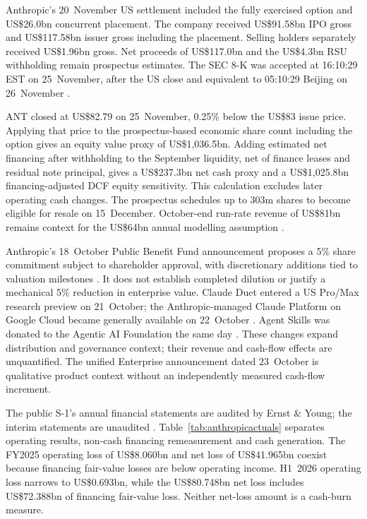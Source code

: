 \documentclass[11pt]{article}
\begin{document}
Anthropic's 20~November US settlement included the fully exercised option and US\$26.0bn concurrent placement. The company received US\$91.58bn IPO gross and US\$117.58bn issuer gross including the placement. Selling holders separately received US\$1.96bn gross. Net proceeds of US\$117.0bn and the US\$4.3bn RSU withholding remain prospectus estimates. The SEC 8-K was accepted at 16:10:29 EST on 25~November, after the US close and equivalent to 05:10:29 Beijing on 26~November \citep{anthropicsettle2026,anthropicpricing2026}.

ANT closed at US\$82.79 on 25~November, 0.25\% below the US\$83 issue price. Applying that price to the prospectus-based economic share count including the option gives an equity value proxy of US\$1,036.5bn. Adding estimated net financing after withholding to the September liquidity, net of finance leases and residual note principal, gives a US\$237.3bn net cash proxy and a US\$1,025.8bn financing-adjusted DCF equity sensitivity. This calculation excludes later operating cash changes. The prospectus schedules up to 303m shares to become eligible for resale on 15~December. October-end run-rate revenue of US\$81bn remains context for the US\$64bn annual modelling assumption \citep{anthropicpricing2026,anthropicnasdaq2026,anthropicoffer2026}.

Anthropic's 18~October Public Benefit Fund announcement proposes a 5\% share commitment subject to shareholder approval, with discretionary additions tied to valuation milestones \citep{anthropicfund2026}. It does not establish completed dilution or justify a mechanical 5\% reduction in enterprise value. Claude Duet entered a US Pro/Max research preview on 21~October; the Anthropic-managed Claude Platform on Google Cloud became generally available on 22~October \citep{anthropicduet2026,anthropiccloud2026}. Agent Skills was donated to the Agentic AI Foundation the same day \citep{anthropicskills2026}. These changes expand distribution and governance context; their revenue and cash-flow effects are unquantified. The unified Enterprise announcement dated 23~October is qualitative product context without an independently measured cash-flow increment.

The public S-1's annual financial statements are audited by Ernst \& Young; the interim statements are unaudited \citep{anthropics1public2026,anthropics1filed2026}. Table~\ref{tab:anthropicactuals} separates operating results, non-cash financing remeasurement and cash generation. The FY2025 operating loss of US\$8.060bn and net loss of US\$41.965bn coexist because financing fair-value losses are below operating income. H1~2026 operating loss narrows to US\$0.693bn, while the US\$80.748bn net loss includes US\$72.388bn of financing fair-value loss. Neither net-loss amount is a cash-burn measure.
\end{document}
